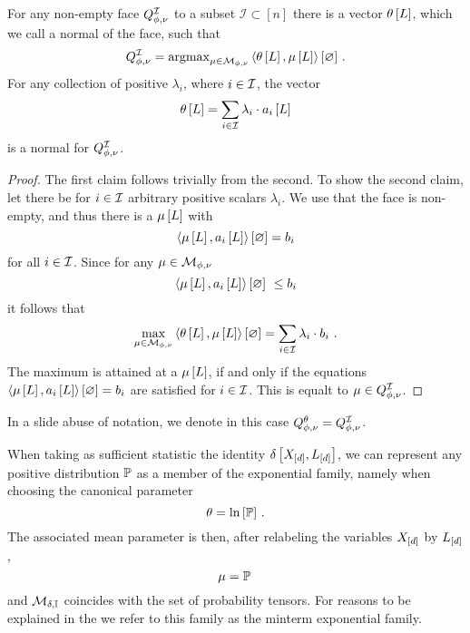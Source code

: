 \begin{theorem}
    \label{the:faceNormal}
    For any non-empty face $Q^{\mathcal{I}}_{\phi,\nu}$ to a subset $\mathcal{I}\subset[n]$ there is a vector $\theta\left[L\right]$, which we call a normal of the face, such that
    \[ Q^{\mathcal{I}}_{\phi,\nu} = \mathrm{argmax}_{\mu\in\mathcal{M}_{\phi,\nu}} \left\langle \theta\left[L\right],\mu\left[L\right]\right\rangle \left[ \varnothing \right]  \, . \]
    For any collection of positive $\lambda_i$, where $i\in\mathcal{I}$, the vector
    \[ \theta\left[L\right] = \sum_{i\in\mathcal{I}} \lambda_i\cdot a_{i}\left[L\right]\]
    is a normal for $Q^{\mathcal{I}}_{\phi,\nu}$.
\end{theorem}
\begin{proof}
    The first claim follows trivially from the second.
    To show the second claim, let there be for $i\in\mathcal{I}$ arbitrary positive scalars $\lambda_i$.
    We use that the face is non-empty, and thus there is a $\mu\left[L\right]$ with
    \[ \left\langle \mu\left[L\right],a_{i}\left[L\right]\right\rangle \left[ \varnothing \right]=b_{i} \]
    for all $i\in\mathcal{I}$.
    Since for any $\mu\in\mathcal{M}_{\phi,\nu}$
    \[ \contraction{\meanparamat{\selvariable},\normalvecofat{i}{\selvariable}} \leq \normalboundof{i} \]
it follows that
\[ \max_{\mu\in\mathcal{M}_{\phi,\nu}} \left\langle \theta\left[L\right],\mu\left[L\right]\right\rangle \left[ \varnothing \right]
= \sum_{i\in\mathcal{I}} \lambda_i \cdot b_{i} \, \, . \]
The maximum is attained at a $\mu\left[L\right]$, if and only if the equations $\left\langle \mu\left[L\right],a_{i}\left[L\right]\right\rangle \left[ \varnothing \right]=b_{i}$ are satisfied for $i\in\mathcal{I}$.
This is equalt to $\mu\in Q^{\mathcal{I}}_{\phi,\nu}$.
\end{proof}

In a slide abuse of notation, we denote in this case $Q^{\theta}_{\phi,\nu} = Q^{\mathcal{I}}_{\phi,\nu}$.





\begin{example}\label{exa:mintermExpFamily}
When taking as sufficient statistic the identity $\delta\left[X_{[d]},L_{[d]}\right]$, we can represent any positive distribution $\mathbb{P}$ as a member of the exponential family, namely when choosing the canonical parameter
\[ \theta = \ln \left[ \mathbb{P} \right] \, . \]
The associated mean parameter is then, after relabeling the variables $X_{[d]}$ by $L_{[d]}$,
\[ \mu = \mathbb{P} \,  \]
and $\mathcal{M}_{\delta,\mathbb{I}}$ coincides with the set of probability tensors.
For reasons to be explained in the  we refer to this family as the minterm exponential family.
\end{example}


